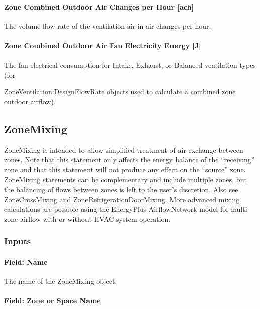\paragraph{Zone Combined Outdoor Air Changes per Hour {[}ach{]}}\label{zone-combined-outdoor-air-changes-per-hour-ach}

The volume flow rate of the ventilation air in air changes per hour.

\paragraph{Zone Combined Outdoor Air Fan Electricity Energy {[}J{]}}\label{zone-combined-outdoor-air-fan-electric-energy-j}

The fan electrical consumption for Intake, Exhaust, or Balanced ventilation types (for

ZoneVentilation:DesignFlowRate objects used to calculate a combined zone outdoor airflow).

\subsection{ZoneMixing}\label{zonemixing}

ZoneMixing is intended to allow simplified treatment of air exchange between zones. Note that this statement only affects the energy balance of the ``receiving'' zone and that this statement will not produce any effect on the ``source'' zone. ZoneMixing statements can be complementary and include multiple zones, but the balancing of flows between zones is left to the user's discretion. Also see \hyperref[zonecrossmixing]{ZoneCrossMixing} and \hyperref[zonerefrigerationdoormixing]{ZoneRefrigerationDoorMixing}. More advanced mixing calculations are possible using the EnergyPlus AirflowNetwork model for multi-zone airflow with or without HVAC system operation.

\subsubsection{Inputs}\label{inputs-5-004}

\paragraph{Field: Name}\label{field-name-5-004}

The name of the ZoneMixing object.

\paragraph{Field: Zone or Space Name}\label{field-zone-name-3}


